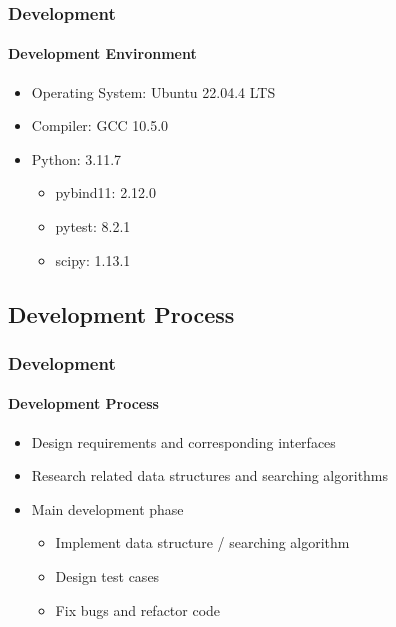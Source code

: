 \documentclass[
	12pt, %
	aspectratio=169, %
]{beamer}
\begin{document}
\begin{frame}
	\frametitle{Development}
	\framesubtitle{Development Environment}

	\begin{itemize}
		\item Operating System: Ubuntu 22.04.4 LTS
		\item Compiler: GCC 10.5.0
		\item Python: 3.11.7
		\begin{itemize}
			\item pybind11: 2.12.0
			\item pytest: 8.2.1
			\item scipy: 1.13.1
		\end{itemize}
	\end{itemize}
\end{frame}


\subsection{Development Process}

\begin{frame}
	\frametitle{Development}
	\framesubtitle{Development Process}

	\begin{itemize}
		\item Design requirements and corresponding interfaces
		\item Research related data structures and searching algorithms
		\item Main development phase
		\begin{itemize}
			\item Implement data structure / searching algorithm
			\item Design test cases
			\item Fix bugs and refactor code
		\end{itemize}
	\end{itemize}
\end{frame}

\end{document}
